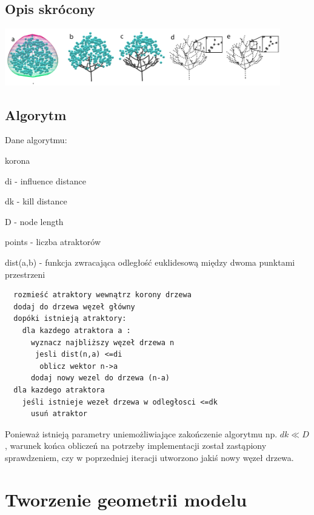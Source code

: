 \subsection{Opis skrócony}
\begin{center}
	\includegraphics[width=120mm]{images/colonization/colonization.png}
	\label{colonization_colonization}
\end{center}


\subsection{Algorytm}

Dane algorytmu:
\begin{my_itemize}
	\item{korona}
	\item{di - influence distance}
	\item{dk - kill distance}
	\item{D - node length}
	\item{points - liczba atraktorów}
	\item{dist(a,b) - funkcja zwracająca odległość euklidesową między dwoma punktami przestrzeni}
\end{my_itemize}

\begin{verbatim}
  rozmieść atraktory wewnątrz korony drzewa
  dodaj do drzewa węzeł główny
  dopóki istnieją atraktory:
    dla kazdego atraktora a :
      wyznacz najbliższy węzeł drzewa n
       jesli dist(n,a) <=di
        oblicz wektor n->a
      dodaj nowy wezel do drzewa (n-a)
  dla kazdego atraktora
    jeśli istnieje wezeł drzewa w odległosci <=dk
      usuń atraktor
\end{verbatim}

Ponieważ istnieją parametry uniemożliwiające zakończenie algorytmu np. $dk \ll D$, warunek końca obliczeń na potrzeby implementacji został zastąpiony sprawdzeniem, czy w poprzedniej iteracji utworzono jakiś nowy węzeł drzewa.

\section{Tworzenie geometrii modelu}
